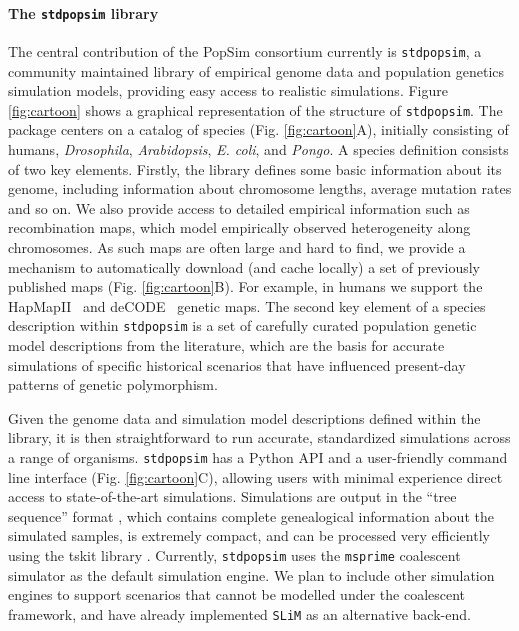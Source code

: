 \documentclass[12pt,halfline,a4paper]{ouparticle}
\newcommand{\stdpopsim}{\texttt{stdpopsim}\xspace}
\begin{document}
\paragraph{The \stdpopsim library}
The central contribution of the PopSim consortium currently is \stdpopsim, a community
maintained library of empirical genome data and population genetics simulation
models, providing easy access to realistic simulations. Figure \ref{fig:cartoon} shows a graphical
representation of the structure of \stdpopsim. The package centers
on a catalog of species (Fig. \ref{fig:cartoon}A), initially consisting of humans, \emph{Drosophila},
\emph{Arabidopsis}, \emph{E. coli}, and \emph{Pongo}. A species definition consists
of two key elements.  Firstly, the library defines
some basic information about its genome, including information about chromosome
lengths, average mutation rates and so on. We also provide access to detailed
empirical information such as recombination maps, which model empirically
observed heterogeneity along chromosomes. As such maps are often large and hard
to find, we provide a mechanism to automatically download (and cache locally) a
set of previously published maps (Fig. \ref{fig:cartoon}B). For example, in humans we support the
HapMapII~\citep{international2007second} and
deCODE~\citep{kong2010fine} genetic maps. The second key element of a species description
within \stdpopsim is a set of carefully curated population genetic model
descriptions from the literature, which are the basis for accurate simulations
of specific historical scenarios that have influenced present-day patterns of
genetic polymorphism.

Given the genome data and simulation model descriptions defined within the
library, it is then straightforward to run accurate, standardized simulations
across a range of organisms. \stdpopsim has a Python API and a user-friendly
command line interface (Fig. \ref{fig:cartoon}C), allowing users with minimal experience direct access to
state-of-the-art simulations. Simulations are output in the “tree sequence”
format \citep{kelleher2016efficient,kelleher2018efficient,kelleher2019inferring}, which
contains complete genealogical information about the simulated samples, is
extremely compact, and can be processed very efficiently using the tskit library
\citep{kelleher2016efficient,kelleher2018efficient}. Currently,
\stdpopsim uses the  \texttt{msprime} coalescent simulator \citep{kelleher2016efficient}
as the default simulation engine. We plan to include other simulation
engines to support scenarios that cannot be modelled under the coalescent framework,
and have already implemented \texttt{SLiM} \citep{haller2019slim} as
an alternative back-end.
\end{document}
